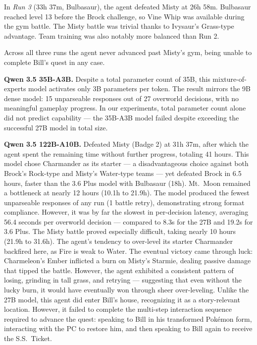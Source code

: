 \documentclass{article}
\begin{document}
In \emph{Run 3} (33h 37m, Bulbasaur), the agent defeated Misty at 26h 58m. Bulbasaur reached level 13 before the Brock challenge, so Vine Whip was available during the gym battle. The Misty battle was trivial thanks to Ivysaur's Grass-type advantage. Team training was also notably more balanced than Run 2.

Across all three runs the agent never advanced past Misty's gym, being unable to complete Bill's quest in any case.

\textbf{Qwen 3.5 35B-A3B.} Despite a total parameter count of 35B, this mixture-of-experts model activates only 3B parameters per token. The result mirrors the 9B dense model: 15 unparseable responses out of 27 overworld decisions, with no meaningful gameplay progress. In our experiments, total parameter count alone did not predict capability --- the 35B-A3B model failed despite exceeding the successful 27B model in total size.

\textbf{Qwen 3.5 122B-A10B.} Defeated Misty (Badge 2) at 31h 37m, after which the agent spent the remaining time without further progress, totaling 41 hours. This model chose Charmander as its starter --- a disadvantageous choice against both Brock's Rock-type and Misty's Water-type teams --- yet defeated Brock in 6.5 hours, faster than the 3.6 Plus model with Bulbasaur (18h). Mt.\ Moon remained a bottleneck at nearly 12 hours (10.1h to 21.9h). The model produced the fewest unparseable responses of any run (1 battle retry), demonstrating strong format compliance. However, it was by far the slowest in per-decision latency, averaging 56.4 seconds per overworld decision --- compared to 8.3s for the 27B and 19.2s for 3.6 Plus. The Misty battle proved especially difficult, taking nearly 10 hours (21.9h to 31.6h). The agent's tendency to over-level its starter Charmander backfired here, as Fire is weak to Water. The eventual victory came through luck: Charmeleon's Ember inflicted a burn on Misty's Starmie, dealing passive damage that tipped the battle. However, the agent exhibited a consistent pattern of losing, grinding in tall grass, and retrying --- suggesting that even without the lucky burn, it would have eventually won through sheer over-leveling. Unlike the 27B model, this agent did enter Bill's house, recognizing it as a story-relevant location. However, it failed to complete the multi-step interaction sequence required to advance the quest: speaking to Bill in his transformed Pok\'{e}mon form, interacting with the PC to restore him, and then speaking to Bill again to receive the S.S.\ Ticket.
\end{document}
